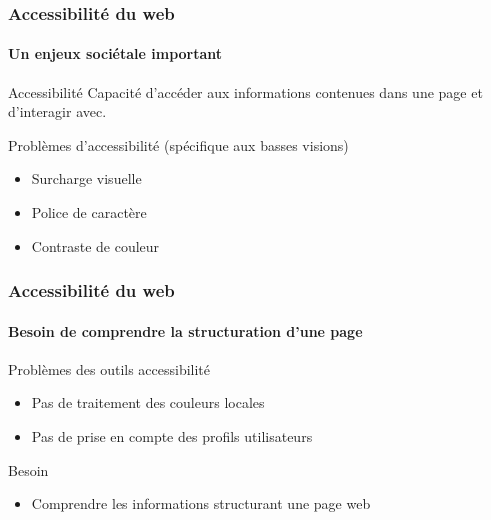 \documentclass[]{beamer}
\begin{document}
\begin{frame}
	\frametitle{Accessibilité du web}
	\framesubtitle{Un enjeux sociétale important}
	\begin{definition}{Accessibilité}
	Capacité d'accéder aux informations contenues dans une page et d'interagir avec.
	\end{definition}
	\begin{block}{Problèmes d'accessibilité (spécifique aux basses visions)}
		\begin{itemize}
			\item Surcharge visuelle
			\item Police de caractère
			\item Contraste de couleur
		\end{itemize}
	\end{block}
\end{frame}

\begin{frame}
\frametitle{Accessibilité du web}
\framesubtitle{Besoin de comprendre la structuration d'une page}
	\begin{block}{Problèmes des outils accessibilité}
	\begin{itemize}
		\item Pas de traitement des couleurs locales
		\item Pas de prise en compte des profils utilisateurs
	\end{itemize}
	\end{block}
	\begin{block}{Besoin}
	\begin{itemize}
		\item Comprendre les informations structurant une page web
	\end{itemize}
	\end{block}
\end{frame}
\end{document}
